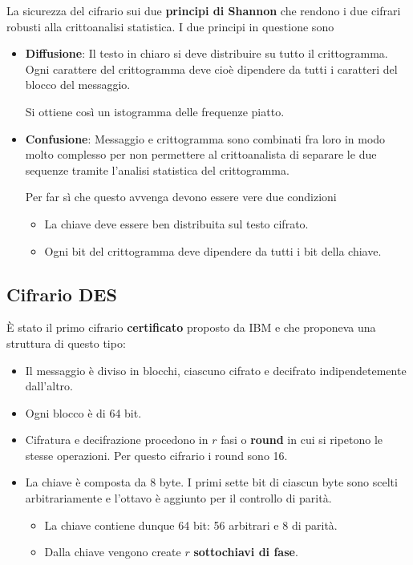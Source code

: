 La sicurezza del cifrario sui due \textbf{principi di Shannon} che rendono i due cifrari robusti alla crittoanalisi
statistica. I due principi in questione sono
\begin{itemize}
	\item \textbf{Diffusione}: Il testo in chiaro si deve distribuire su tutto il crittogramma. Ogni carattere del
	      crittogramma deve cio\`e dipendere da tutti i caratteri del blocco del messaggio.

	      Si ottiene cos\`i un istogramma delle frequenze piatto.
	\item \textbf{Confusione}: Messaggio e crittogramma sono combinati fra loro in modo molto complesso per non
	      permettere al crittoanalista di separare le due sequenze tramite l'analisi statistica del crittogramma.

	      Per far s\`i che questo avvenga devono essere vere due condizioni
	      \begin{itemize}
		      \item La chiave deve essere ben distribuita sul testo cifrato.
		      \item Ogni bit del crittogramma deve dipendere da tutti i bit della chiave.
	      \end{itemize}
\end{itemize}

\subsection{Cifrario DES}
\`E stato il primo cifrario \textbf{certificato} proposto da IBM e che proponeva una struttura di questo tipo:
\begin{itemize}
	\item Il messaggio \`e diviso in blocchi, ciascuno cifrato e decifrato indipendetemente dall'altro.
	\item Ogni blocco \`e di 64 bit.
	\item Cifratura e decifrazione procedono in $r$ fasi o \textbf{round} in cui si ripetono le stesse operazioni. Per
	      questo cifrario i round sono 16.
	\item La chiave \`e composta da 8 byte. I primi sette bit di ciascun byte sono scelti arbitrariamente e l'ottavo
	      \`e aggiunto per il controllo di parit\`a.
	      \begin{itemize}
		      \item La chiave contiene dunque 64 bit: 56 arbitrari e 8 di parit\`a.
		      \item Dalla chiave vengono create $r$ \textbf{sottochiavi di fase}.
	      \end{itemize}
\end{itemize}

